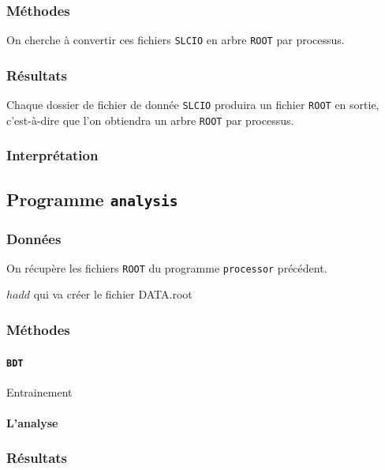 \documentclass[10pt,a4paper]{report}
\newcommand{\cad}{c'est-à-dire\xspace}
\newcommand{\ROOT}{\texttt{ROOT}\xspace}
\newcommand{\SLCIO}{\texttt{SLCIO}\xspace}
\newcommand{\processor}{\texttt{processor}\xspace}
\newcommand{\analysis}{\texttt{analysis}\xspace}
\begin{document}
\subsubsection{Méthodes}

On cherche à convertir ces fichiers \SLCIO en arbre \ROOT par processus.

\subsubsection{Résultats}

Chaque dossier de fichier de donnée \SLCIO produira un fichier \ROOT en sortie, \cad que l'on obtiendra un arbre \ROOT par processus.


\subsubsection{Interprétation}

\subsection{Programme \analysis}

\subsubsection{Données}

On récupère les fichiers \ROOT du programme \processor précédent. 

$ hadd $ qui va créer le fichier DATA.root

\subsubsection{Méthodes}

\paragraph{\texttt{BDT}}

Entrainement

\paragraph{L'analyse}


\subsubsection{Résultats}
\end{document}
